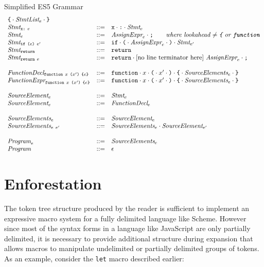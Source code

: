\documentclass[preprint,10pt]{sigplanconf}
\begin{document}
\begin{displayfigure*}{\label{fig:grammar}Simplified ES5 Grammar}
\[\begin{array}{lcl}
  \texttt{\{}\cdot \textit{StmtList}_{e}\cdot\texttt{\}} 
  \\
  \textit{Stmt}_{\texttt{x}\texttt{:}~e} &::=&
  \texttt{x}\cdot \texttt{:}\cdot\textit{Stmt}_{e}
  \\
  \textit{Stmt}_{e} &::=& 
  \textit{AssignExpr}_{e} \cdot \texttt{;}
  \qquad  \textit{where lookahead \( \not =
    \texttt{\{} \) or \( \texttt{function} \)}
  \\
  \textit{Stmt}_{\texttt{if}~\texttt{(}e\texttt{)}~e'} &::=& 
  \texttt{if}\cdot 
  \texttt{(}\cdot \textit{AssignExpr}_{e} \cdot \texttt{)}\cdot \textit{Stmt}_{e'}
  \\
  \textit{Stmt}_{\texttt{return}} &::=& 
  \texttt{return}
  \\
  \textit{Stmt}_{\texttt{return}~e} &::=& 
  \texttt{return}\cdot \textrm{[no line terminator
    here]}~\textit{AssignExpr}_{e}\cdot \texttt{;}
  \\ \\
  \textit{FunctionDecl}_{\texttt{function}~x~\texttt{(}x'\texttt{)}~\texttt{\{}e\texttt{\}}} 
  &::=&
  \texttt{function} \cdot x \cdot \texttt{(} \cdot x' \cdot\texttt{)}\cdot
  \texttt{\{}\cdot \textit{SourceElements}_{e} \cdot\texttt{\}}
  \\
  \textit{FunctionExpr}_{\texttt{function}~x~\texttt{(}x'\texttt{)}~\texttt{\{}e\texttt{\}}} 
  &::=&
  \texttt{function} \cdot x \cdot \texttt{(} \cdot x' \cdot\texttt{)}\cdot
  \texttt{\{}\cdot \textit{SourceElements}_{e} \cdot\texttt{\}}
  \\ \\
  \textit{SourceElement}_{e} &::=& \textit{Stmt}_{e} 
  \\
  \textit{SourceElement}_{e} &::=& \textit{FunctionDecl}_{e}
  \\ \\

  \textit{SourceElements}_{e} &::=& \textit{SourceElement}_{e}
  \\
  \textit{SourceElements}_{e~e'} &::=&
  \textit{SourceElements}_{e}\cdot \textit{SourceElement}_{e'}
  \\ \\
  \textit{Program}_{e} &::=& \textit{SourceElements}_{e}
  \\
  \textit{Program}_{} &::=& \epsilon
\end{array}
\]  
\end{displayfigure*}

\section{Enforestation}
\label{sec:enforest}

The token tree structure produced by the reader is sufficient to
implement an expressive macro system for a fully delimited language
like Scheme. However since most of the syntax forms in a language like
JavaScript are only partially delimited, it is necessary to provide
additional structure during expansion that allows macros to manipulate
undelimited or partially delimited groups of tokens. As an example,
consider the \lstinline!let! macro described earlier:
\end{document}
